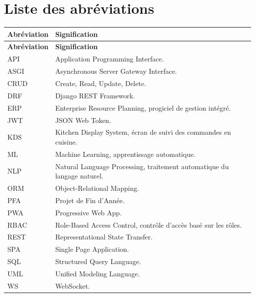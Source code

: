 \chapter*{Liste des abréviations}
\begin{longtable}{p{3cm}p{11cm}}
\toprule
\textbf{Abréviation} & \textbf{Signification} \\
\midrule
\endfirsthead
\toprule
\textbf{Abréviation} & \textbf{Signification} \\
\midrule
\endhead
API & Application Programming Interface. \\
ASGI & Asynchronous Server Gateway Interface. \\
CRUD & Create, Read, Update, Delete. \\
DRF & Django REST Framework. \\
ERP & Enterprise Resource Planning, progiciel de gestion intégré. \\
JWT & JSON Web Token. \\
KDS & Kitchen Display System, écran de suivi des commandes en cuisine. \\
ML & Machine Learning, apprentissage automatique. \\
NLP & Natural Language Processing, traitement automatique du langage naturel. \\
ORM & Object-Relational Mapping. \\
PFA & Projet de Fin d'Année. \\
PWA & Progressive Web App. \\
RBAC & Role-Based Access Control, contrôle d'accès basé sur les rôles. \\
REST & Representational State Transfer. \\
SPA & Single Page Application. \\
SQL & Structured Query Language. \\
UML & Unified Modeling Language. \\
WS & WebSocket. \\
\bottomrule
\end{longtable}
